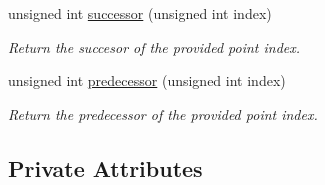 \begin{DoxyCompactItemize}
unsigned int \hyperlink{classmultiscale_1_1MinEnclosingTriangleFinder_a075472a453bfcb0eedd06a4a185241fc}{successor} (unsigned int index)
\begin{DoxyCompactList}\small\item\em Return the succesor of the provided point index. \end{DoxyCompactList}\item 
unsigned int \hyperlink{classmultiscale_1_1MinEnclosingTriangleFinder_aa5ec6fafd63c6d99d095dfc58c47cd4e}{predecessor} (unsigned int index)
\begin{DoxyCompactList}\small\item\em Return the predecessor of the provided point index. \end{DoxyCompactList}\end{DoxyCompactItemize}
\subsection*{Private Attributes}
